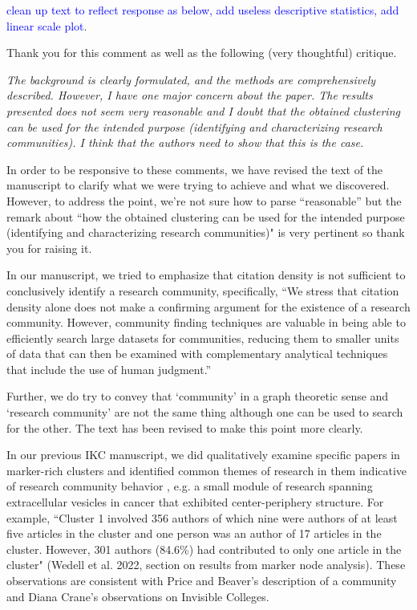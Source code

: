 \documentclass[11pt, oneside]{article}   	%
\begin{document}
\textcolor{blue}{clean up text to reflect response as below, add useless descriptive statistics, add linear scale plot}.

Thank you for this comment as well as the following (very thoughtful) critique.

\emph{The background is clearly formulated, and the methods are comprehensively described. However, I have one major concern about the paper. The results presented does not seem very reasonable and I doubt that the obtained clustering can be used for the intended purpose (identifying and characterizing research communities). I think that the authors need to show that this is the case.}

In order to be responsive to these comments, we have revised the text of the manuscript to clarify what we were trying to achieve and what we discovered. However, to address the point, we're not 
sure how to parse ``reasonable'' but the remark about ``how the obtained clustering can be used for the intended purpose (identifying and characterizing research communities)" is very pertinent so thank you for raising it. 

In our manuscript, we tried to emphasize that citation density is not sufficient to conclusively identify a research community, specifically, ``We stress that citation density alone does not make a confirming argument for the existence of a research community. However, community finding techniques are valuable in being able to efficiently search large datasets for communities, reducing them to smaller units of data that can then be examined with complementary analytical techniques that include the use of human judgment.''

Further, we do try to convey that `community' in a graph theoretic sense and `research community' are not the same thing although one can be used to search for the other. The text has been revised to make this point more clearly. 

In our previous IKC manuscript, we did qualitatively examine specific papers in marker-rich clusters and identified common themes of research in them indicative of research community behavior , e.g. a small module of research spanning extracellular vesicles in cancer that exhibited center-periphery structure. For example, ``Cluster 1 involved 356 authors of which nine were authors of at least five articles in the cluster and one person was an author of 17 articles in the cluster. However, 301 authors (84.6\%) had contributed to only one article in the cluster" (Wedell et al. 2022, section on results from marker node analysis). These observations are consistent with Price and Beaver's description of a community and Diana Crane's observations on Invisible Colleges. 
\end{document}
